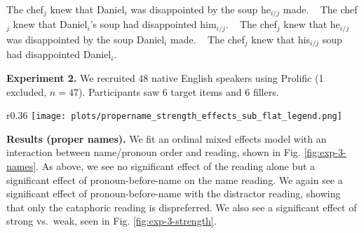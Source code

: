 \documentclass[12pt,letterpaper]{article}
\newcommand{\sectitle}[1]{\smallskip \textbf{#1.}}
\begin{document}
\ex \label{ex:s-l-name} The chef$_j$ knew that Daniel$_i$ was disappointed by the soup he$_{i/j}$ made.
\xe
\ex~ \label{ex:w-l-name} The chef$_j$ knew that Daniel$_i$'s soup had disappointed him$_{i/j}$.
\xe
\ex~ \label{ex:s-b-name} The chef$_j$ knew that he$_{i/j}$ was disappointed by the soup Daniel$_i$ made.
\xe
\ex~ \label{ex:w-b-name} The chef$_j$ knew that his$_{i/j}$ soup had disappointed Daniel$_i$.
\xe

\sectitle{Experiment 2} We  recruited 48 native English speakers using Prolific (1 excluded, $n=47$). Participants saw 6 target items and 6 fillers. %

\begin{wrapfigure}{r}{0.36\textwidth}
\centering
\texttt{[image: plots/propername\_strength\_effects\_sub\_flat\_legend.png]}
\caption{Strong vs. weak in names}
\label{fig:exp-3-strength}
\end{wrapfigure}

\sectitle{Results (proper names)} We fit an ordinal mixed effects model with an interaction between name/pronoun order and reading, shown in Fig. \ref{fig:exp-3-names}. As above, we see no significant effect of the reading alone 
but a significant effect of pronoun-before-name on the name reading.
We again see a significant effect of pronoun-before-name with the distractor reading, 
showing that only the cataphoric reading is dispreferred. %
We also see a significant effect of strong vs.~weak, seen in Fig. \ref{fig:exp-3-strength}. %
\end{document}
